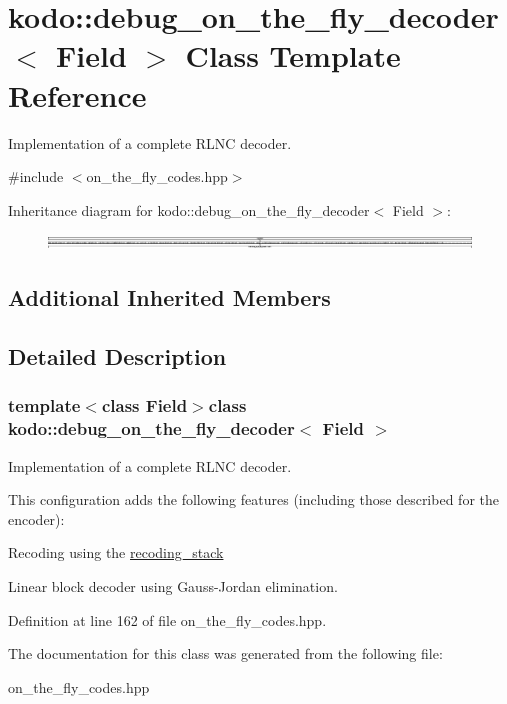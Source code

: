 \hypertarget{classkodo_1_1debug__on__the__fly__decoder}{\section{kodo\-:\-:debug\-\_\-on\-\_\-the\-\_\-fly\-\_\-decoder$<$ Field $>$ Class Template Reference}
\label{classkodo_1_1debug__on__the__fly__decoder}
}


Implementation of a complete R\-L\-N\-C decoder.  




{\ttfamily \#include $<$on\-\_\-the\-\_\-fly\-\_\-codes.\-hpp$>$}

Inheritance diagram for kodo\-:\-:debug\-\_\-on\-\_\-the\-\_\-fly\-\_\-decoder$<$ Field $>$\-:\begin{figure}[H]
\begin{center}
\leavevmode
\includegraphics[height=0.370534cm]{classkodo_1_1debug__on__the__fly__decoder}
\end{center}
\end{figure}
\subsection*{Additional Inherited Members}


\subsection{Detailed Description}
\subsubsection*{template$<$class Field$>$class kodo\-::debug\-\_\-on\-\_\-the\-\_\-fly\-\_\-decoder$<$ Field $>$}

Implementation of a complete R\-L\-N\-C decoder. 

This configuration adds the following features (including those described for the encoder)\-:
\begin{DoxyItemize}
\item Recoding using the \hyperlink{classkodo_1_1recoding__stack}{recoding\-\_\-stack}
\item Linear block decoder using Gauss-\/\-Jordan elimination. 
\end{DoxyItemize}

Definition at line 162 of file on\-\_\-the\-\_\-fly\-\_\-codes.\-hpp.



The documentation for this class was generated from the following file\-:\begin{DoxyCompactItemize}
\item 
on\-\_\-the\-\_\-fly\-\_\-codes.\-hpp\end{DoxyCompactItemize}
